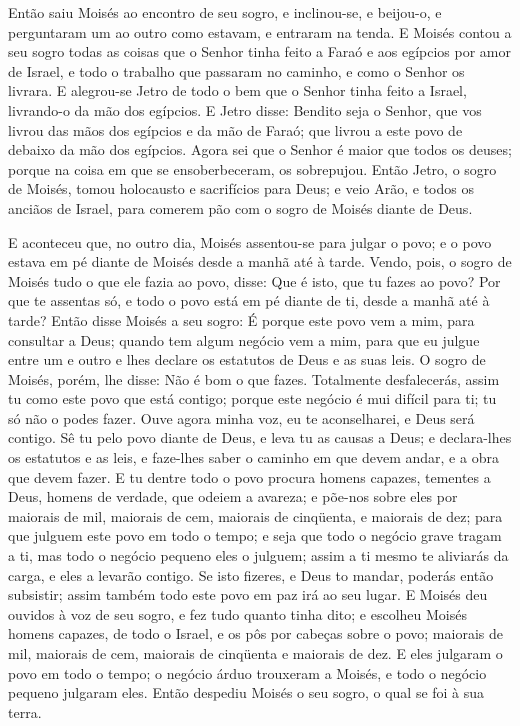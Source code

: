 Então saiu Moisés ao encontro de seu sogro, e inclinou-se, e
beijou-o, e perguntaram um ao outro como estavam, e entraram na
tenda. E Moisés contou a seu sogro todas as coisas que o Senhor
tinha feito a Faraó e aos egípcios por amor de Israel, e todo o
trabalho que passaram no caminho, e como o Senhor os livrara. E
alegrou-se Jetro de todo o bem que o Senhor tinha feito a Israel,
livrando-o da mão dos egípcios. E Jetro disse: Bendito seja o
Senhor, que vos livrou das mãos dos egípcios e da mão de Faraó; que
livrou a este povo de debaixo da mão dos egípcios. Agora sei
que o Senhor é maior que todos os deuses; porque na coisa em que se
ensoberbeceram, os sobrepujou. Então Jetro, o sogro de
Moisés, tomou holocausto e sacrifícios para Deus; e veio Arão, e
todos os anciãos de Israel, para comerem pão com o sogro de Moisés
diante de Deus.

E aconteceu que, no outro dia, Moisés assentou-se para julgar o
povo; e o povo estava em pé diante de Moisés desde a manhã até à
tarde. Vendo, pois, o sogro de Moisés tudo o que ele fazia ao
povo, disse: Que é isto, que tu fazes ao povo? Por que te assentas
só, e todo o povo está em pé diante de ti, desde a manhã até à
tarde? Então disse Moisés a seu sogro: É porque este povo vem
a mim, para consultar a Deus; quando tem algum negócio vem a
mim, para que eu julgue entre um e outro e lhes declare os estatutos
de Deus e as suas leis. O sogro de Moisés, porém, lhe disse:
Não é bom o que fazes. Totalmente desfalecerás, assim tu como
este povo que está contigo; porque este negócio é mui difícil para
ti; tu só não o podes fazer. Ouve agora minha voz, eu te
aconselharei, e Deus será contigo. Sê tu pelo povo diante de Deus, e
leva tu as causas a Deus; e declara-lhes os estatutos e as
leis, e faze-lhes saber o caminho em que devem andar, e a obra que
devem fazer. E tu dentre todo o povo procura homens capazes,
tementes a Deus, homens de verdade, que odeiem a avareza; e põe-nos
sobre eles por maiorais de mil, maiorais de cem, maiorais de
cinqüenta, e maiorais de dez; para que julguem este povo em
todo o tempo; e seja que todo o negócio grave tragam a ti, mas todo
o negócio pequeno eles o julguem; assim a ti mesmo te aliviarás da
carga, e eles a levarão contigo. Se isto fizeres, e Deus to
mandar, poderás então subsistir; assim também todo este povo em paz
irá ao seu lugar. E Moisés deu ouvidos à voz de seu sogro, e
fez tudo quanto tinha dito; e escolheu Moisés homens capazes,
de todo o Israel, e os pôs por cabeças sobre o povo; maiorais de
mil, maiorais de cem, maiorais de cinqüenta e maiorais de dez.
E eles julgaram o povo em todo o tempo; o negócio árduo
trouxeram a Moisés, e todo o negócio pequeno julgaram eles.
Então despediu Moisés o seu sogro, o qual se foi à sua terra.

